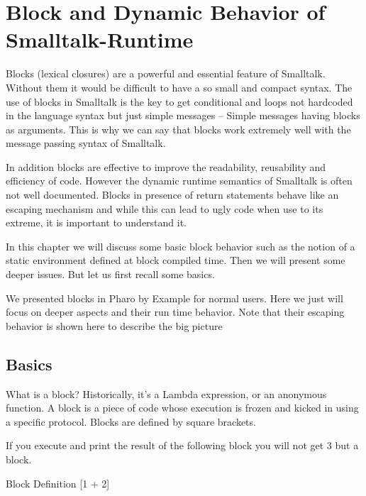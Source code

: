 \documentclass[a4paper,10pt,twoside]{book}
\begin{document}
\fi
\sloppy
\chapter{Block and Dynamic Behavior of Smalltalk-Runtime}



Blocks (lexical closures) are a powerful and essential feature of Smalltalk. Without them it
would be difficult to have a so small and compact syntax. The use of blocks in Smalltalk
is the key to get conditional and loops not hardcoded in the language syntax but just 
simple messages -- Simple messages having blocks as arguments. This is why we can say that 
blocks work extremely well with the message passing syntax of Smalltalk.

In addition blocks are  effective to improve the readability, reusability and efficiency of code. 
However the dynamic runtime semantics of Smalltalk is often not well documented. Blocks in presence of
return statements behave like an escaping mechanism and while this can lead to ugly code when use to its extreme, it is important to understand it. 

In this chapter we will discuss some basic block behavior such as the notion of a static environment 
defined at block compiled time. Then we will present some deeper issues. But let us first recall some basics.


We presented blocks in Pharo by Example for normal users. Here we just will focus on deeper aspects and their run time behavior.
Note that their escaping behavior is shown here to describe the big picture 

\section{Basics}
What is a block? Historically, it's a Lambda expression, or an anonymous function. A block is a piece of code whose execution is frozen and kicked in using a specific protocol.  Blocks are defined by square brackets. 

If you execute and print the result of the following block you will not get 3 but a block. 
\begin{code}{Block Definition}
[1 + 2]
\end{code}
\end{document}
